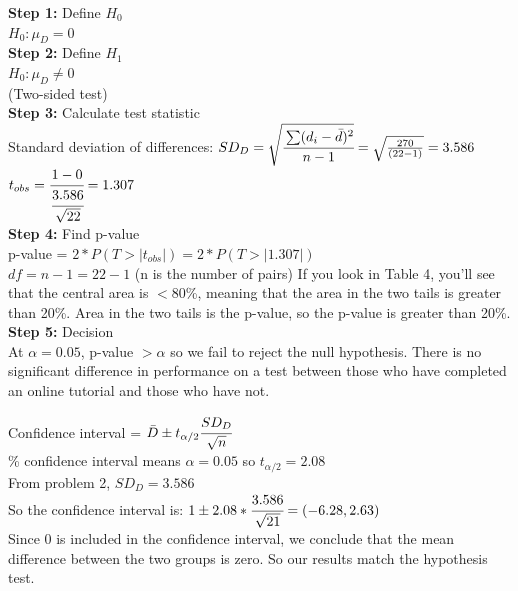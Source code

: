 \documentclass[12pt]{article}
\begin{document}
\begin{framed}
\textbf{Step 1:} Define $H_{0}$ \\
$H_{0}: \mu_{D} = 0$\\

\textbf{Step 2:} Define $H_{1}$ \\
$H_{0}: \mu_{D} \neq 0$\\
(Two-sided test)\\

\textbf{Step 3:} Calculate test statistic \\
Standard deviation of differences: $SD_{D} = \sqrt{\cfrac{\sum(d_{i}-\bar{d})^{2}}{n-1}} = \sqrt{\frac{270}{(22-1)}} = 3.586 $ \\

$t_{obs} = \cfrac{1-0}{\cfrac{3.586}{\sqrt{22}}} = 1.307$ \\

\textbf{Step 4:} Find p-value \\

p-value = $2*P(T > |t_{obs}|) = 2*P(T>|1.307|)$ \\

$df= n - 1 = 22 - 1$ (n is the number of pairs)
If you look in Table 4, you'll see that the central area is $<$80\%, meaning that the area in the two tails is greater than 20\%. Area in the two tails is the p-value, so the p-value is greater than 20\%.\\

\textbf{Step 5:} Decision \\ 
At $\alpha = 0.05$, p-value $> \alpha$ so we fail to reject the null hypothesis. There is no significant difference in performance on a test between those who have completed an online tutorial and those who have not. \\

\end{framed}

\begin{framed}
\noindent Confidence interval = $\bar{D} \pm t_{\alpha/2}\cfrac{SD_{D}}{\sqrt{n}}$ \\

\% confidence interval means $\alpha = 0.05$ so $t_{\alpha/2} = 2.08$ \\

\noindent From problem 2, $SD_{D} = 3.586$ \\

\noindent So the confidence interval is: $1 \pm 2.08*\cfrac{3.586}{\sqrt{21}} = (-6.28, 2.63)$ \\

Since 0 is included in the confidence interval, we conclude that the mean difference between the two groups is zero. So our results match the hypothesis test. 
\end{framed}
\end{document}
